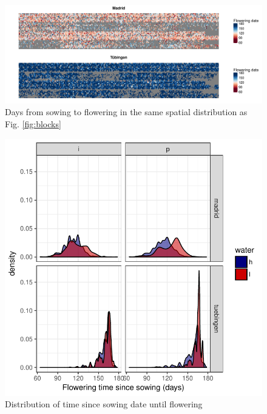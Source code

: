 \documentclass[12pt,]{article}
\begin{document}
\begin{figure}
    \centerline{\includegraphics[width=6in]{../figs/Figure_raw_flowering.pdf}}
    \caption{ Days from sowing to flowering in the same spatial distribution as Fig. \ref{fig:blocks}}
    \label{fig:flowerraw}
\end{figure}

\begin{figure}
    \centerline{\includegraphics[width=5in]{../figs/Figure_flowering_distribution.pdf}}
    \caption{ Distribution of time since sowing date until flowering}
    \label{fig:flowerdistribution}
\end{figure}
\end{document}
